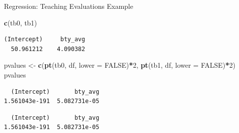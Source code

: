 \documentclass[
  ignorenonframetext,
]{beamer}
\newenvironment{Shaded}{\begin{snugshade}}{\end{snugshade}}
\newcommand{\AttributeTok}[1]{\textcolor[rgb]{0.13,0.29,0.53}{#1}}
\newcommand{\ConstantTok}[1]{\textcolor[rgb]{0.56,0.35,0.01}{#1}}
\newcommand{\DecValTok}[1]{\textcolor[rgb]{0.00,0.00,0.81}{#1}}
\newcommand{\FunctionTok}[1]{\textcolor[rgb]{0.13,0.29,0.53}{\textbf{#1}}}
\newcommand{\NormalTok}[1]{#1}
\newcommand{\OtherTok}[1]{\textcolor[rgb]{0.56,0.35,0.01}{#1}}
\newcommand{\SpecialCharTok}[1]{\textcolor[rgb]{0.81,0.36,0.00}{\textbf{#1}}}
\begin{document}
\begin{frame}[fragile]{Regression: Teaching Evaluations Example}
\protect\hypertarget{regression-teaching-evaluations-example-13}{}
\begin{Shaded}
\begin{Highlighting}[]
\FunctionTok{c}\NormalTok{(tb0, tb1)}
\end{Highlighting}
\end{Shaded}

\begin{verbatim}
(Intercept)     bty_avg 
  50.961212    4.090382 
\end{verbatim}

\begin{Shaded}
\begin{Highlighting}[]
\NormalTok{pvalues }\OtherTok{\textless{}{-}} \FunctionTok{c}\NormalTok{(}\FunctionTok{pt}\NormalTok{(tb0, df, }\AttributeTok{lower =} \ConstantTok{FALSE}\NormalTok{)}\SpecialCharTok{*}\DecValTok{2}\NormalTok{, }
             \FunctionTok{pt}\NormalTok{(tb1, df, }\AttributeTok{lower =} \ConstantTok{FALSE}\NormalTok{)}\SpecialCharTok{*}\DecValTok{2}\NormalTok{)}
\NormalTok{pvalues}
\end{Highlighting}
\end{Shaded}

\begin{verbatim}
  (Intercept)       bty_avg 
1.561043e-191  5.082731e-05 
\end{verbatim}

\begin{Shaded}
\end{Shaded}

\begin{verbatim}
  (Intercept)       bty_avg 
1.561043e-191  5.082731e-05 
\end{verbatim}
\end{frame}
\end{document}
